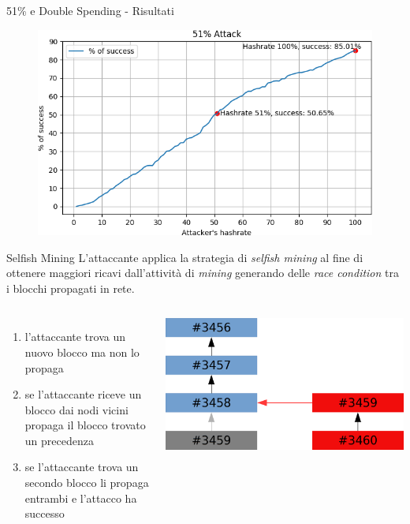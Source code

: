 \documentclass{beamer}
\begin{document}
\begin{frame}{51\% e Double Spending - Risultati}
	\begin{figure}
		\centering
        \includegraphics[width=0.9\linewidth]{./images/51-v3.png}
	\end{figure}
\end{frame}

\begin{frame}{Selfish Mining}
	L'attaccante applica la strategia di \textit{selfish mining} al fine di ottenere maggiori ricavi dall'attività di \textit{mining} generando delle \textit{race condition} tra i blocchi propagati in rete.
    \begin{columns}
    		\begin{enumerate}
    			\item l'attaccante trova un nuovo blocco ma non lo propaga
                \item se l'attaccante riceve un blocco dai nodi vicini propaga il blocco trovato un precedenza
                \item se l'attaccante trova un secondo blocco li propaga entrambi e l'attacco ha successo
    		\end{enumerate}
            
			\includegraphics[width=\linewidth]{./images/selfish.png}
	\end{columns}
\end{frame}
\end{document}

